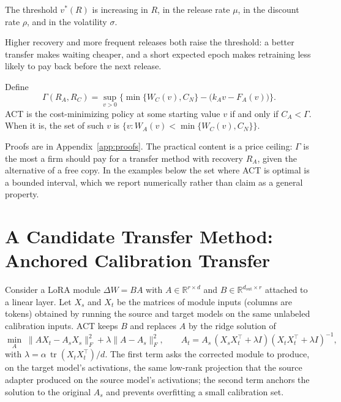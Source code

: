 \documentclass[ijoc,nonblindrev]{informs4}
\begin{document}
\begin{proposition}\label{prop:cs}
The threshold $v^*(R)$ is increasing in $R$, in the release rate $\mu$, in the discount rate $\rho$, and in the
volatility $\sigma$.
\end{proposition}

Higher recovery and more frequent releases both raise the threshold: a better transfer makes waiting cheaper,
and a short expected epoch makes retraining less likely to pay back before the next release.

\begin{proposition}\label{prop:act}
Define
\begin{equation}
\Gamma(R_A,R_C)=\sup_{v>0}\Big\{\min\{W_C(v),C_N\}-\big(k_Av-F_A(v)\big)\Big\}.
\end{equation}
ACT is the cost-minimizing policy at some starting value $v$ if and only if $C_A<\Gamma$. When it is, the set of such
$v$ is $\{v: W_A(v)<\min\{W_C(v),C_N\}\}$.
\end{proposition}

Proofs are in Appendix~\ref{app:proofs}. The practical content is a price ceiling: $\Gamma$ is the most a firm should
pay for a transfer method with recovery $R_A$, given the alternative of a free copy. In the examples below the
set where ACT is optimal is a bounded interval, which we report numerically rather than claim as a general property.

\section{A Candidate Transfer Method: Anchored Calibration Transfer}\label{sec:act}

Consider a LoRA module $\Delta W=BA$ with $A\in\mathbb R^{r\times d}$ and $B\in\mathbb R^{d_{\text{out}}\times r}$ attached to a
linear layer. Let $X_s$ and $X_t$ be the matrices of module inputs (columns are tokens) obtained by running the source
and target models on the same unlabeled calibration inputs. ACT keeps $B$ and replaces $A$ by the ridge solution of
\begin{equation}
\min_{A}\;\|AX_t-A_sX_s\|_F^2+\lambda\|A-A_s\|_F^2,\qquad
A_t=A_s\,(X_sX_t^{\top}+\lambda I)(X_tX_t^{\top}+\lambda I)^{-1},
\end{equation}
with $\lambda=\alpha\,\operatorname{tr}(X_tX_t^{\top})/d$. The first term asks the corrected module to produce, on the
target model's activations, the same low-rank projection that the source adapter produced on the source model's
activations; the second term anchors the solution to the original $A_s$ and prevents overfitting a small calibration
set.
\end{document}
